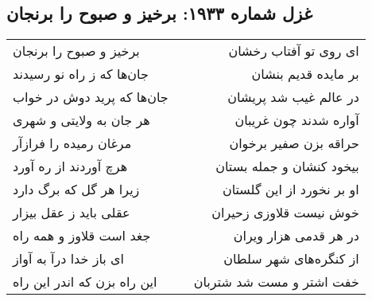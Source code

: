 \begin{center}
\section*{غزل شماره ۱۹۳۳: برخیز و صبوح را برنجان}
\label{sec:1933}
\begin{longtable}{l p{0.5cm} r}
برخیز و صبوح را برنجان
&&
ای روی تو آفتاب رخشان
\\
جان‌ها که ز راه نو رسیدند
&&
بر مایده قدیم بنشان
\\
جان‌ها که پرید دوش در خواب
&&
در عالم غیب شد پریشان
\\
هر جان به ولایتی و شهری
&&
آواره شدند چون غریبان
\\
مرغان رمیده را فرازآر
&&
حراقه بزن صفیر برخوان
\\
هرچ آوردند از ره آورد
&&
بیخود کنشان و جمله بستان
\\
زیرا هر گل که برگ دارد
&&
او بر نخورد از این گلستان
\\
عقلی باید ز عقل بیزار
&&
خوش نیست قلاوزی زحیران
\\
جغد است قلاوز و همه راه
&&
در هر قدمی هزار ویران
\\
ای باز خدا درآ به آواز
&&
از کنگره‌های شهر سلطان
\\
این راه بزن که اندر این راه
&&
خفت اشتر و مست شد شتربان
\\
\end{longtable}
\end{center}
